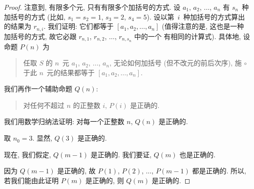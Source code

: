 \begin{proof}
    注意到, 有限多个元, 只有有限多个加括号的方式.
    设 \(a_1\), \(a_2\), \(\dots\), \(a_n\)
    有 \(s_n\)~种加括号的方式
    (比如, \(s_1 = s_2 = 1\),
    \(s_3 = 2\), \(s_4 = 5\)).
    设以第~\(i\)~种加括号的方式算出的结果为 \(r_{n,i}\).
    我们证明:
    它们都等于
    \([a_1, a_2, \dots, a_n]\)
    (值得注意的是, 这也是一种加括号的方式,
    故它必跟 \(r_{n,1}\), \(r_{n,2}\), \(\dots\),
    \(r_{n,s_n}\) 中的一个%
    有相同的计算式).
    具体地, 设命题 \(P(n)\) 为
    \begin{quotation}
        任取 \(S\) 的 \(n\)~元
        \(a_1\), \(a_2\), \(\dots\), \(a_n\),
        无论如何加括号
        (但不改元的前后次序),
        施 \(\circ\) 于此 \(n\)~元的结果都等于
        \([a_1, a_2, \dots, a_n]\).
    \end{quotation}
    我们再作一个辅助命题 \(Q(n)\):
    \begin{quotation}
        对任何不超过 \(n\) 的正整数 \(i\),
        \(P(i)\) 是正确的.
    \end{quotation}
    我们用数学归纳法证明:
    对每一个正整数 \(n\), \(Q(n)\) 是正确的.

    取 \(n_0 = 3\).
    显然, \(Q(3)\) 是正确的.

    现在, 我们假定, \(Q(m-1)\) 是正确的.
    我们要证, \(Q(m)\) 也是正确的.

    因为 \(Q(m-1)\) 是正确的,
    故 \(P(1)\), \(P(2)\), \(\dots\), \(P(m-1)\) 都是正确的.
    所以, 若我们能由此证明 \(P(m)\) 是正确的,
    则 \(Q(m)\) 是正确的.


\end{proof}
